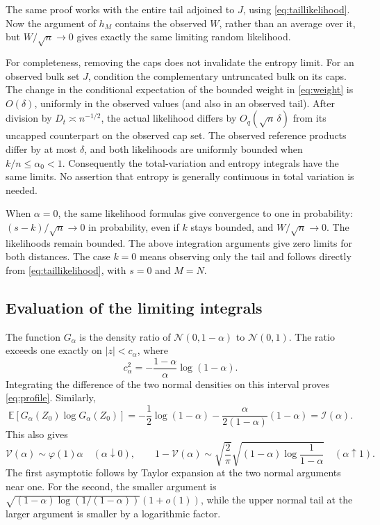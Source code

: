 \documentclass[11pt,letterpaper]{article}
\numberwithin{equation}{section}
\theoremstyle{definition}
\theoremstyle{remark}
\newcommand{\EE}{\mathbb E}
\newcommand{\Normal}{\mathcal N}
\newcommand{\vp}{\mathcal V}
\newcommand{\ip}{\mathcal I}
\begin{document}
The same proof works with the entire tail adjoined to $J$, using
\eqref{eq:taillikelihood}. Now the argument of $h_M$ contains the observed
$W$, rather than an average over it, but $W/\sqrt n\to0$ gives exactly the
same limiting random likelihood.

For completeness, removing the caps does not invalidate the entropy limit.
For an observed bulk set $J$, condition the complementary untruncated bulk
on its caps. The change in the conditional expectation of the bounded
weight in \eqref{eq:weight} is $O(\delta)$, uniformly in the observed values
(and also in an observed tail). After division by $D_t\asymp n^{-1/2}$,
the actual likelihood differs by $O_q(\sqrt n\,\delta)$ from its uncapped
counterpart on the observed cap set. The observed reference products differ
by at most $\delta$, and both likelihoods are uniformly bounded when
$k/n\le\alpha_0<1$. Consequently the total-variation and entropy integrals
have the same limits. No assertion that entropy is generally continuous in
total variation is needed.

When $\alpha=0$, the same likelihood formulas give convergence to one in
probability: $(s-k)/\sqrt n\to0$ in probability, even if $k$ stays bounded,
and $W/\sqrt n\to0$. The likelihoods remain bounded. The above integration
arguments give zero limits for both distances. The case $k=0$ means observing
only the tail and follows directly from \eqref{eq:taillikelihood}, with
$s=0$ and $M=N$.

\subsection{Evaluation of the limiting integrals}

The function $G_\alpha$ is the density ratio of $\Normal(0,1-\alpha)$ to
$\Normal(0,1)$. The ratio exceeds one exactly on $|z|<c_\alpha$, where
\[
 c_\alpha^2=-\frac{1-\alpha}{\alpha}\log(1-\alpha).
\]
Integrating the difference of the two normal densities on this interval
proves \eqref{eq:profile}. Similarly,
\[
 \EE[G_\alpha(Z_0)\log G_\alpha(Z_0)]
 =-\frac12\log(1-\alpha)
  -\frac{\alpha}{2(1-\alpha)}(1-\alpha)
 =\ip(\alpha).
\]
This also gives
\begin{equation}
 \vp(\alpha)\sim\varphi(1)\alpha\quad(\alpha\downarrow0),\qquad
 1-\vp(\alpha)\sim
 \sqrt{\frac2\pi}\sqrt{(1-\alpha)\log\frac1{1-\alpha}}
 \quad(\alpha\uparrow1).
 \label{eq:profileends}
\end{equation}
The first asymptotic follows by Taylor expansion at the two normal arguments
near one. For the second, the smaller argument is
$\sqrt{(1-\alpha)\log(1/(1-\alpha))}(1+o(1))$, while the upper normal tail
at the larger argument is smaller by a logarithmic factor.
\end{document}
